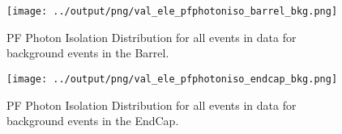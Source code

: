 \documentclass[11pt]{book}
\begin{document}
\begin{figure}[htb]
\centering
\texttt{[image: ../output/png/val\_ele\_pfphotoniso\_barrel\_bkg.png]}
\caption{PF Photon Isolation Distribution for all events in data for background events in the Barrel.}
\label{fig:val_ele_pfphotoniso_barrel_bkg}
\end{figure}

\begin{figure}[htb]
\centering
\texttt{[image: ../output/png/val\_ele\_pfphotoniso\_endcap\_bkg.png]}
\caption{PF Photon Isolation Distribution for all events in data for background events in the EndCap.}
\label{fig:val_ele_pfphotoniso_endcap_bkg}
\end{figure}
\end{document}
